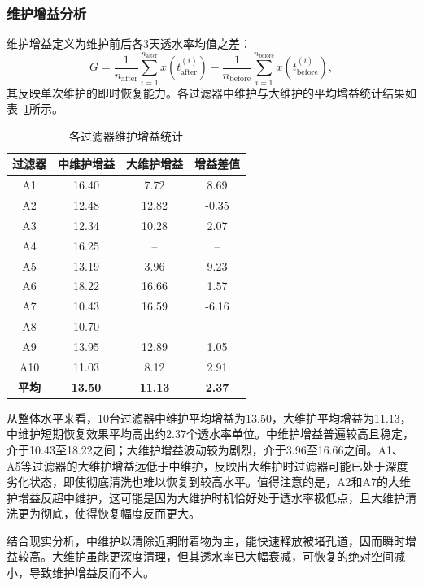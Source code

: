 \documentclass[withoutpreface,bwprint]{cumcmthesis}
\begin{document}
\subsubsection{维护增益分析}

维护增益定义为维护前后各3天透水率均值之差：
\[
	G = \frac{1}{n_{\text{after}}} \sum_{i=1}^{n_{\text{after}}} x(t_{\text{after}}^{(i)}) - \frac{1}{n_{\text{before}}} \sum_{i=1}^{n_{\text{before}}} x(t_{\text{before}}^{(i)}),
\]
其反映单次维护的即时恢复能力。各过滤器中维护与大维护的平均增益统计结果如表~\ref{tab:维护增益}所示。

\begin{table}[H]
	\centering
	\setlength{\tabcolsep}{4pt}
	\renewcommand{\arraystretch}{1.2}
	\caption{各过滤器维护增益统计}
	\label{tab:维护增益}
	\begin{tabular}{cccc}
		\toprule
		\textbf{过滤器} & \textbf{中维护增益} & \textbf{大维护增益} & \textbf{增益差值} \\
		\midrule
		\rowcolor{LightBlue}
		A1 & 16.40 & 7.72 & 8.69 \\
		A2 & 12.48 & 12.82 & -0.35 \\
		\rowcolor{LightBlue}
		A3 & 12.34 & 10.28 & 2.07 \\
		A4 & 16.25 & -- & -- \\
		\rowcolor{LightBlue}
		A5 & 13.19 & 3.96 & 9.23 \\
		A6 & 18.22 & 16.66 & 1.57 \\
		\rowcolor{LightBlue}
		A7 & 10.43 & 16.59 & -6.16 \\
		A8 & 10.70 & -- & -- \\
		\rowcolor{LightBlue}
		A9 & 13.95 & 12.89 & 1.05 \\
		A10 & 11.03 & 8.12 & 2.91 \\
		\midrule
		\textbf{平均} & \textbf{13.50} & \textbf{11.13} & \textbf{2.37} \\
		\bottomrule
	\end{tabular}
\end{table}

从整体水平来看，10台过滤器中维护平均增益为13.50，大维护平均增益为11.13，中维护短期恢复效果平均高出约2.37个透水率单位。中维护增益普遍较高且稳定，介于10.43至18.22之间；大维护增益波动较为剧烈，介于3.96至16.66之间。A1、A5等过滤器的大维护增益远低于中维护，反映出大维护时过滤器可能已处于深度劣化状态，即使彻底清洗也难以恢复到较高水平。值得注意的是，A2和A7的大维护增益反超中维护，这可能是因为大维护时机恰好处于透水率极低点，且大维护清洗更为彻底，使得恢复幅度反而更大。

结合现实分析，中维护以清除近期附着物为主，能快速释放被堵孔道，因而瞬时增益较高。大维护虽能更深度清理，但其透水率已大幅衰减，可恢复的绝对空间减小，导致维护增益反而不大。
\end{document}
